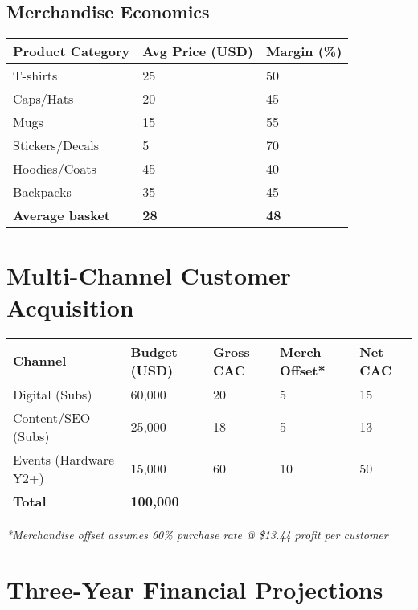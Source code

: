 \documentclass[11pt]{article}
\begin{document}
\subsection{Merchandise Economics}
\begin{table}[htbp]
\centering
\begin{tabularx}{\linewidth}{l Y Y}
\toprule
Product Category & Avg Price (USD) & Margin (\%) \\\midrule
T-shirts & 25 & 50 \\
Caps/Hats & 20 & 45 \\
Mugs & 15 & 55 \\
Stickers/Decals & 5 & 70 \\
Hoodies/Coats & 45 & 40 \\
Backpacks & 35 & 45 \\
\textbf{Average basket} & \textbf{28} & \textbf{48} \\
\bottomrule
\end{tabularx}
\end{table}

\section{Multi-Channel Customer Acquisition}

\begin{table}[htbp]
\centering
\begin{tabularx}{\linewidth}{l Y Y Y Y}
\toprule
Channel & Budget (USD) & Gross CAC & Merch Offset* & Net CAC \\\midrule
Digital (Subs) & 60,000 & 20 & 5 & 15 \\
Content/SEO (Subs) & 25,000 & 18 & 5 & 13 \\
Events (Hardware Y2+) & 15,000 & 60 & 10 & 50 \\\midrule
\textbf{Total} & \textbf{100,000} &  &  &  \\
\bottomrule
\end{tabularx}
\end{table}
\textit{*Merchandise offset assumes 60\% purchase rate @ \$13.44 profit per customer}

\section{Three-Year Financial Projections}
\end{document}
